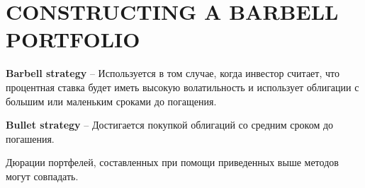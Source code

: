 \documentclass[a4paper,12pt]{article}
\begin{document}
\section{CONSTRUCTING A BARBELL PORTFOLIO}

\textbf{Barbell strategy} -- Используется в том случае, когда инвестор считает, что процентная ставка будет иметь высокую волатильность и использует облигации с большим или маленьким сроками до погащения.

\textbf{Bullet strategy} -- Достигается покупкой облигаций со средним сроком до погашения.

Дюрации портфелей, составленных при помощи приведенных выше методов могут совпадать.
\end{document}
